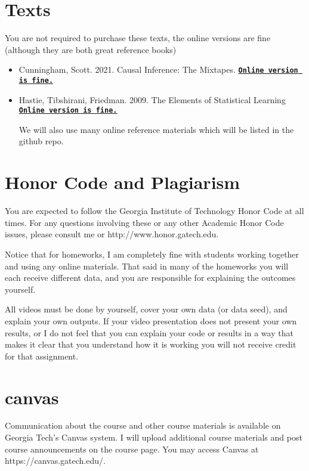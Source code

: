 \documentclass[11pt]{article}
\begin{document}
\section*{Texts}

You are not required to purchase these texts, the online versions are fine (although they are both great reference books)
\begin{itemize}
\item Cunningham, Scott. 2021. Causal Inference: The Mixtapes.  \href{https://mixtape.scunning.com/}{\tt\bf  Online version is fine.} 

\item Hastie, Tibshirani, Friedman. 2009.  The Elements of Statistical Learning  \href{https://hastie.su.domains/ElemStatLearn/}{\tt\bf  Online version is fine.} 


We will also use many online reference materials which will be listed in the github repo. 
\end{itemize} 


\section*{Honor Code and Plagiarism}
You are expected to follow the Georgia Institute of Technology Honor Code at all times. 
For any questions involving these or any other Academic Honor Code issues, please consult me or
http://www.honor.gatech.edu.

Notice that for homeworks, I am completely fine with students working together and using any online materials. That said in many of the homeworks you will each receive different data, and you are responsible for explaining the outcomes yourself.

All videos must be done by yourself, cover your own data (or data seed), and explain your own outputs. If your video presentation does not present your own results, or I do not feel that you can explain your code or results in a way that makes it clear that you understand how it is working you will not receive credit for that assignment. 


\section*{canvas}
Communication   about   the   course   and   other   course   materials   is   available   on   Georgia   Tech’s
Canvas system.  I will upload additional course materials and post course announcements on the
course page.  You may access Canvas at https://canvas.gatech.edu/.
\end{document}
